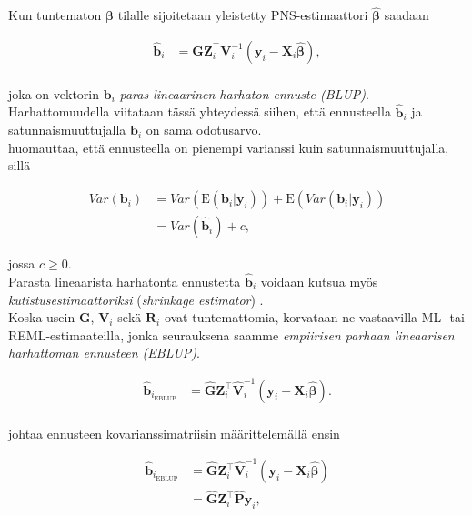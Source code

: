 \documentclass[finnish]{docopts}
\begin{document}
Kun tuntematon $\bm{\beta}$ tilalle sijoitetaan yleistetty PNS-estimaattori $\hat{\bm{\beta}}$ saadaan

$$
\begin{aligned}
\hat{\bm{b}}_i &= \bm{G} \bm{Z}_{i}^\top \bm{V}_{i}^{-1}(\bm{y}_i - \bm{X}_i \hat{\bm{\beta}}), \\
\end{aligned}
$$

joka on vektorin $\bm{b}_i$ \textit{paras lineaarinen harhaton ennuste (BLUP)}.\\

Harhattomuudella viitataan tässä yhteydessä siihen, että ennusteella $\hat{\bm{b}}_i$ ja satunnaismuuttujalla $\bm{b}_i$ on sama odotusarvo. \\

\cite{nissinen09} huomauttaa, että ennusteella on pienempi varianssi kuin satunnaismuuttujalla, sillä

$$
\begin{aligned}
Var(\bm{b}_i) &= Var(\text{E}(\bm{b}_i | \bm{y}_i)) + \text{E}(Var(\bm{b}_i | \bm{y}_i)) \\
&= Var(\hat{\bm{b}}_i) + c,
\end{aligned}
$$

jossa $c \geq 0$.\\

Parasta lineaarista harhatonta ennustetta $\hat{\bm{b}}_i$ voidaan kutsua myös \textit{kutistusestimaattoriksi} (\textit{shrinkage estimator}) \citep{robinson1991}.\\

Koska usein $\bm{G}$, $\bm{V}_{i}$ sekä $\bm{R}_i$ ovat tuntemattomia, korvataan ne vastaavilla ML- tai REML-estimaateilla, jonka seurauksena saamme \textit{empiirisen parhaan lineaarisen harhattoman ennusteen (EBLUP)}.

$$
\begin{aligned}
\hat{\bm{b}}_{i_\text{EBLUP}} &= \hat{\bm{G}} \bm{Z}_{i}^\top \hat{\bm{V}}_{i}^{-1}(\bm{y}_i - \bm{X}_i \hat{\bm{\beta}}). \\
\end{aligned}
$$

\cite{nissinen09} johtaa ennusteen kovarianssimatriisin määrittelemällä ensin

$$
\begin{aligned}
\hat{\bm{b}}_{i_\text{EBLUP}} &= \hat{\bm{G}} \bm{Z}_{i}^\top \hat{\bm{V}}_{i}^{-1}(\bm{y}_i - \bm{X}_i \hat{\bm{\beta}})\\
&= \hat{\bm{G}} \bm{Z}_{i}^\top \hat{\bm{P}}\bm{y}_i,
\end{aligned}
$$
\end{document}
